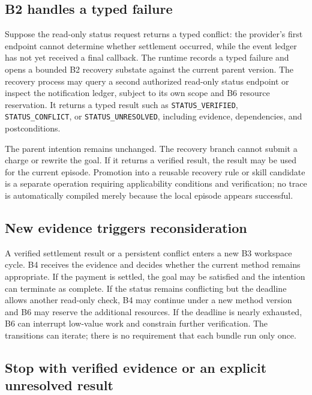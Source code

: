 \subsection{B2 handles a typed failure}
\label{subsec:ch18-productx-b2}

Suppose the read-only status request returns a typed conflict: the provider's first endpoint cannot determine whether settlement occurred, while the event ledger has not yet received a final callback. The runtime records a typed failure and opens a bounded B2 recovery substate against the current parent version. The recovery process may query a second authorized read-only status endpoint or inspect the notification ledger, subject to its own scope and B6 resource reservation. It returns a typed result such as \texttt{STATUS\_VERIFIED}, \texttt{STATUS\_CONFLICT}, or \texttt{STATUS\_UNRESOLVED}, including evidence, dependencies, and postconditions.

The parent intention remains unchanged. The recovery branch cannot submit a charge or rewrite the goal. If it returns a verified result, the result may be used for the current episode. Promotion into a reusable recovery rule or skill candidate is a separate operation requiring applicability conditions and verification; no trace is automatically compiled merely because the local episode appears successful.

\subsection{New evidence triggers reconsideration}
\label{subsec:ch18-productx-reconsideration}

A verified settlement result or a persistent conflict enters a new B3 workspace cycle. B4 receives the evidence and decides whether the current method remains appropriate. If the payment is settled, the goal may be satisfied and the intention can terminate as complete. If the status remains conflicting but the deadline allows another read-only check, B4 may continue under a new method version and B6 may reserve the additional resources. If the deadline is nearly exhausted, B6 can interrupt low-value work and constrain further verification. The transitions can iterate; there is no requirement that each bundle run only once.

\subsection{Stop with verified evidence or an explicit unresolved result}
\label{subsec:ch18-productx-stop}

